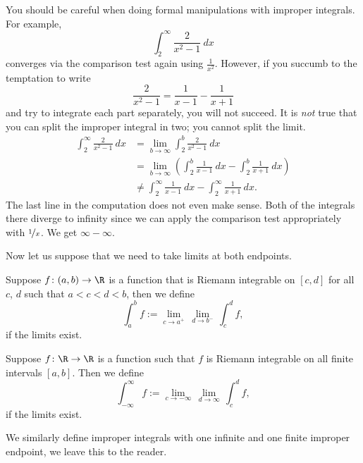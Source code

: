 \documentclass[12pt]{book}
\begin{document}
\begin{example}
You should be careful when doing formal manipulations with improper
integrals.
For example,
\begin{equation*}
\int_2^\infty \frac{2}{x^2-1}~dx
\end{equation*}
converges via the comparison test again using $\frac{1}{x^2}$.
However, if you
succumb to the temptation to write
\begin{equation*}
\frac{2}{x^2-1} = 
\frac{1}{x-1}
-
\frac{1}{x+1} 
\end{equation*}
and try to integrate each part separately, you will not succeed.
It is \emph{not} true that you can split the improper
integral in two; you cannot split the limit.
\begin{equation*}
\begin{split}
\int_2^\infty \frac{2}{x^2-1} ~dx &=
\lim_{b\to \infty} \int_2^b \frac{2}{x^2-1} ~dx
\\
&=
\lim_{b\to \infty}
\left(
\int_2^b \frac{1}{x-1}~dx
-
\int_2^b \frac{1}{x+1}~dx
\right)
\\
&\not=
\int_2^\infty \frac{1}{x-1}~dx
-
\int_2^\infty \frac{1}{x+1}~dx .
\end{split}
\end{equation*}
The last line in the computation does not even make sense.
Both of the
integrals there diverge to infinity since we can
apply the comparison test appropriately with
$\nicefrac{1}{x}$.
We get $\infty - \infty$.
\end{example}

Now let us suppose that we need to take limits at both endpoints.

\begin{defn}
Suppose $f \colon (a,b) \to \R$ is a function
that is Riemann integrable on $[c,d]$ for all $c$, $d$
such that $a < c < d < b$, then we define
\begin{equation*}
\int_a^b f := \lim_{c \to a^+} \, \lim_{d \to b^-} \, \int_{c}^{d} f ,
\end{equation*}
if the limits exist.

Suppose $f \colon \R \to \R$ is a function such that
$f$ is Riemann integrable on all finite intervals $[a,b]$.
Then
we define
\begin{equation*}
\int_{-\infty}^\infty f := \lim_{c \to -\infty} \, \lim_{d \to \infty} \, \int_c^d f ,
\end{equation*}
if the limits exist.

We similarly define improper integrals with one infinite and one finite
improper endpoint, we leave this to the reader.
\end{defn}
\end{document}

